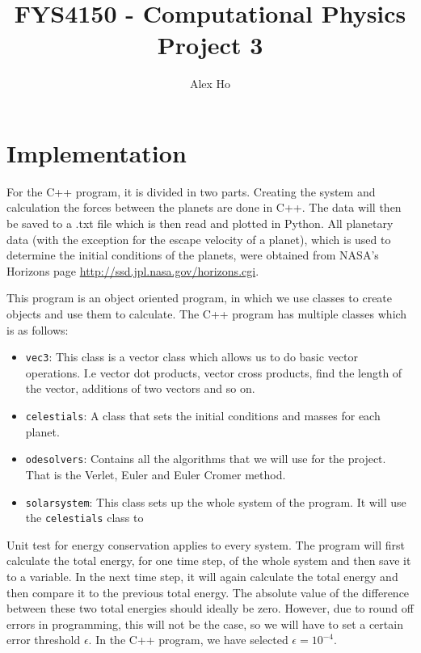 \documentclass[12pt]{article}
\author{Alex Ho}
\title{FYS4150 - Computational Physics \\ Project 3}
\begin{document}
\maketitle
\section*{Implementation}
For the C++ program, it is divided in two parts. Creating the system and calculation the forces between the planets are done in C++. The data will then be saved to a .txt file which is then read and plotted in Python. All planetary data (with the exception for the escape velocity of a planet), which is used to determine the initial conditions of the planets, were obtained from NASA's Horizons page \url{http://ssd.jpl.nasa.gov/horizons.cgi}. 

This program is an object oriented program, in which we use classes to create objects and use them to calculate. The C++ program has multiple classes which is as follows:
\begin{itemize}
\item \texttt{vec3}: This class is a vector class which allows us to do basic vector operations. I.e vector dot products, vector cross products, find the length of the vector, additions of two vectors and so on.
\item \texttt{celestials}: A class that sets the initial conditions and masses for each planet. 
\item \texttt{odesolvers}: Contains all the algorithms that we will use for the project. That is the Verlet, Euler and Euler Cromer method.
\item \texttt{solarsystem}: This class sets up the whole system of the program. It will use the \texttt{celestials} class to 
\end{itemize}

Unit test for energy conservation applies to every system. The program will first calculate the total energy, for one time step, of the whole system and then save it to a variable. In the next time step, it will again calculate the total energy and then compare it to the previous total energy. The absolute value of the difference between these two total energies should ideally be zero. However, due to round off errors in programming, this will not be the case, so we will have to set a certain error threshold $\epsilon$. In the C++ program, we have selected $\epsilon = 10^{-4}$.
\end{document}
